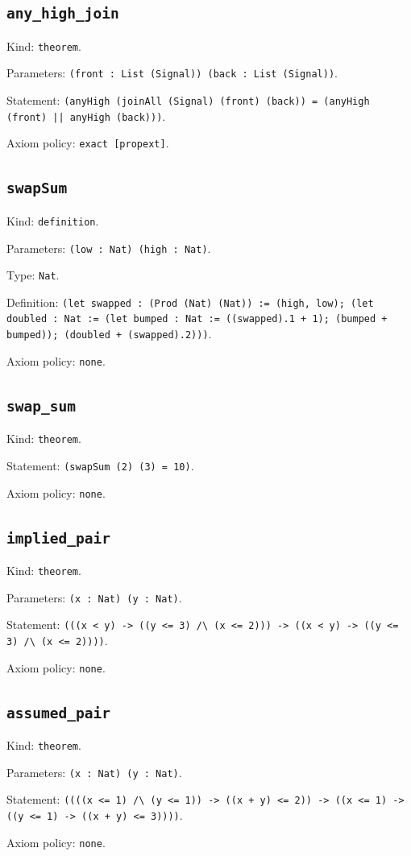 \documentclass[11pt]{article}
\begin{document}
\subsection*{\texttt{any\_high\_join}}
\noindent Kind: \texttt{theorem}.\par
\noindent Parameters: \texttt{(front : List (Signal)) (back : List (Signal))}.\par
\noindent Statement: \texttt{(anyHigh (joinAll (Signal) (front) (back)) = (anyHigh (front) || anyHigh (back)))}.\par
\noindent Axiom policy: \texttt{exact [propext]}.\par
\subsection*{\texttt{swapSum}}
\noindent Kind: \texttt{definition}.\par
\noindent Parameters: \texttt{(low : Nat) (high : Nat)}.\par
\noindent Type: \texttt{Nat}.\par
\noindent Definition: \texttt{(let swapped : (Prod (Nat) (Nat)) := (high, low); (let doubled : Nat := (let bumped : Nat := ((swapped).1 + 1); (bumped + bumped)); (doubled + (swapped).2)))}.\par
\noindent Axiom policy: \texttt{none}.\par
\subsection*{\texttt{swap\_sum}}
\noindent Kind: \texttt{theorem}.\par
\noindent Statement: \texttt{(swapSum (2) (3) = 10)}.\par
\noindent Axiom policy: \texttt{none}.\par
\subsection*{\texttt{implied\_pair}}
\noindent Kind: \texttt{theorem}.\par
\noindent Parameters: \texttt{(x : Nat) (y : Nat)}.\par
\noindent Statement: \texttt{(((x < y) -> ((y <= 3) /\textbackslash{} (x <= 2))) -> ((x < y) -> ((y <= 3) /\textbackslash{} (x <= 2))))}.\par
\noindent Axiom policy: \texttt{none}.\par
\subsection*{\texttt{assumed\_pair}}
\noindent Kind: \texttt{theorem}.\par
\noindent Parameters: \texttt{(x : Nat) (y : Nat)}.\par
\noindent Statement: \texttt{((((x <= 1) /\textbackslash{} (y <= 1)) -> ((x + y) <= 2)) -> ((x <= 1) -> ((y <= 1) -> ((x + y) <= 3))))}.\par
\noindent Axiom policy: \texttt{none}.\par
\end{document}
